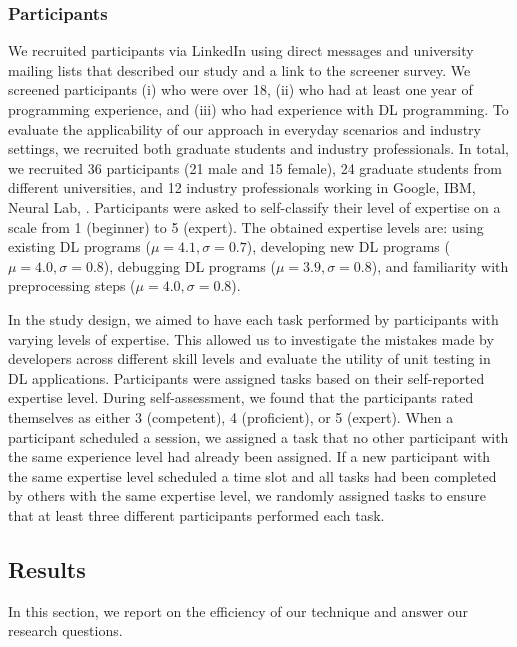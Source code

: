\subsubsection{Participants}
We recruited participants via LinkedIn using direct messages and 
university mailing lists that described our study and a link to the screener survey. We screened participants (i) who were over 18, (ii) who had at least one year of programming experience, and (iii) who had experience with DL programming. 
To evaluate the applicability of our approach in everyday scenarios and industry settings, we recruited both graduate students and 
industry professionals.
In total, we recruited 36 participants (21 male and 15 female), 24 graduate students from different universities, and 12 industry professionals working in Google, IBM, Neural Lab, \etc.
Participants were asked to self-classify their level of expertise on a scale from 1 (beginner)
to 5 (expert). The obtained expertise levels are: using existing DL programs ($\mu = 4.1, \sigma = 0.7$), developing new DL programs ($\mu = 4.0, \sigma = 0.8$), debugging DL programs ($\mu = 3.9, \sigma = 0.8$), and familiarity with preprocessing steps ($\mu = 4.0, \sigma = 0.8$).

In the study design, we aimed to have each task performed by participants with varying levels of expertise.
This allowed us to investigate the mistakes made by developers across different skill levels and evaluate the utility of unit testing in DL applications.
Participants were assigned tasks based on their self-reported expertise level. 
During self-assessment, we found that the participants rated themselves as either 3 (competent), 4 (proficient), or 5 (expert).
When a participant scheduled a session, we assigned a task that no other participant with the same experience level had already been assigned.  If a new participant with the same expertise level scheduled a time slot
and all tasks had been completed by others with the same
expertise level, we randomly assigned tasks to ensure that 
at least three different participants performed each task.

\subsection{Results}
In this section, we 
report on the efficiency of
our technique 
and answer our research questions.

